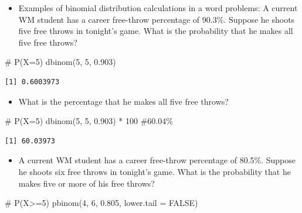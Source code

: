 \documentclass[
  letterpaper,
  DIV=11,
  numbers=noendperiod]{scrreprt}
\newenvironment{Shaded}{\begin{snugshade}}{\end{snugshade}}
\newcommand{\AttributeTok}[1]{\textcolor[rgb]{0.40,0.45,0.13}{#1}}
\newcommand{\CommentTok}[1]{\textcolor[rgb]{0.37,0.37,0.37}{#1}}
\newcommand{\ConstantTok}[1]{\textcolor[rgb]{0.56,0.35,0.01}{#1}}
\newcommand{\DecValTok}[1]{\textcolor[rgb]{0.68,0.00,0.00}{#1}}
\newcommand{\FloatTok}[1]{\textcolor[rgb]{0.68,0.00,0.00}{#1}}
\newcommand{\FunctionTok}[1]{\textcolor[rgb]{0.28,0.35,0.67}{#1}}
\newcommand{\NormalTok}[1]{\textcolor[rgb]{0.00,0.23,0.31}{#1}}
\newcommand{\SpecialCharTok}[1]{\textcolor[rgb]{0.37,0.37,0.37}{#1}}
\providecommand{\tightlist}{%
  \setlength{\itemsep}{0pt}\setlength{\parskip}{0pt}}\usepackage{longtable,booktabs,array}
\begin{document}
\begin{itemize}
\tightlist
\item
  Examples of binomial distribution calculations in a word problems: A
  current WM student has a career free-throw percentage of 90.3\%.
  Suppose he shoots five free throws in tonight's game. What is the
  probability that he makes all five free throws?
\end{itemize}

\begin{Shaded}
\begin{Highlighting}[]
\CommentTok{\# P(X=5)}
\FunctionTok{dbinom}\NormalTok{(}\DecValTok{5}\NormalTok{, }\DecValTok{5}\NormalTok{, }\FloatTok{0.903}\NormalTok{)}
\end{Highlighting}
\end{Shaded}

\begin{verbatim}
[1] 0.6003973
\end{verbatim}

\begin{itemize}
\tightlist
\item
  What is the percentage that he makes all five free throws?
\end{itemize}

\begin{Shaded}
\begin{Highlighting}[]
\CommentTok{\# P(X=5)}
\FunctionTok{dbinom}\NormalTok{(}\DecValTok{5}\NormalTok{, }\DecValTok{5}\NormalTok{, }\FloatTok{0.903}\NormalTok{) }\SpecialCharTok{*} \DecValTok{100}  \CommentTok{\#60.04\%}
\end{Highlighting}
\end{Shaded}

\begin{verbatim}
[1] 60.03973
\end{verbatim}

\begin{itemize}
\tightlist
\item
  A current WM student has a career free-throw percentage of 80.5\%.
  Suppose he shoots six free throws in tonight's game. What is the
  probability that he makes five or more of his free throws?
\end{itemize}

\begin{Shaded}
\begin{Highlighting}[]
\CommentTok{\# P(X\textgreater{}=5)}
\FunctionTok{pbinom}\NormalTok{(}\DecValTok{4}\NormalTok{, }\DecValTok{6}\NormalTok{, }\FloatTok{0.805}\NormalTok{, }\AttributeTok{lower.tail =} \ConstantTok{FALSE}\NormalTok{)}
\end{Highlighting}
\end{Shaded}
\end{document}
